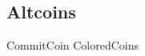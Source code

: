 \cite{jgarzik-smartcoin}
\cite{miller2001capability}
\cite{szabo1997formalizing,bitcointalk-bondmarkets,wiki-distributedmarkets}


\subsection{Altcoins}



\begin{table}
\begin{tabular}
CommitCoin
ColoredCoins
\end{tabular}
\end{table}

